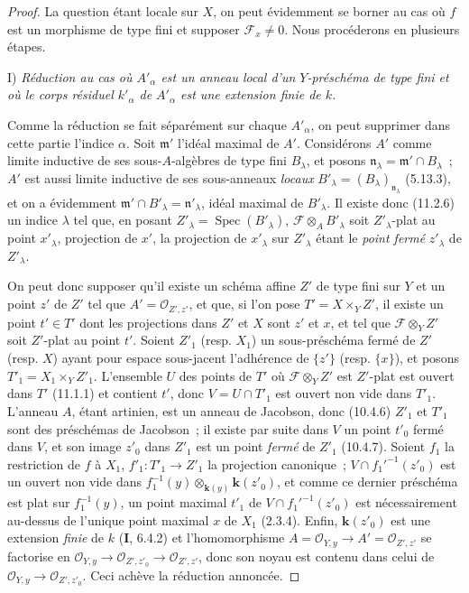 \begin{proof}
La question étant locale sur $X$, on peut évidemment se borner au cas où $f$
est un morphisme de type fini et supposer $\mathcal F_x\neq0$. Nous procéderons
en plusieurs étapes.

\medskip
\noindent I) \emph{Réduction au cas où $A'_\alpha$ est un anneau local
d'un $Y$-préschéma de type fini et où le corps résiduel $k'_\alpha$ de
$A'_\alpha$ est une extension finie de $k$.}

\medskip
Comme la réduction se fait séparément sur chaque $A'_\alpha$, on peut supprimer
dans cette partie l'indice $\alpha$. Soit $\mathfrak m'$ l'idéal maximal de
$A'$. Considérons $A'$ comme limite inductive de ses sous-$A$-algèbres de type
fini $B_\lambda$, et posons $\mathfrak n_\lambda=\mathfrak m'\cap B_\lambda$~;
$A'$ est aussi limite inductive de ses sous-anneaux \emph{locaux}
$B'_\lambda=(B_\lambda)_{\mathfrak n_\lambda}$ (5.13.3), et on a évidemment
$\mathfrak m'\cap B'_\lambda=\mathfrak n'_\lambda$, idéal maximal de
$B'_\lambda$. Il existe donc (11.2.6) un indice $\lambda$ tel que, en posant
$Z'_\lambda=\operatorname{Spec}(B'_\lambda)$,
$\mathcal F\otimes_A B'_\lambda$ soit $Z'_\lambda$-plat au point $x'_\lambda$,
projection de $x'$, la projection de $x'_\lambda$ sur $Z'_\lambda$ étant le
\emph{point fermé} $z'_\lambda$ de $Z'_\lambda$.

On peut donc supposer qu'il existe un schéma affine $Z'$ de type fini sur $Y$
et un point $z'$ de $Z'$ tel que $A'=\mathcal O_{Z',z'}$, et que, si l'on pose
$T'=X\times_Y Z'$, il existe un point $t'\in T'$ dont les projections dans
$Z'$ et $X$ sont $z'$ et $x$, et tel que $\mathcal F\otimes_Y Z'$ soit
$Z'$-plat au point $t'$. Soient $Z'_1$ (resp. $X_1$) un sous-préschéma fermé de
$Z'$ (resp. $X$) ayant pour espace sous-jacent l'adhérence de $\{z'\}$ (resp.
$\{x\}$), et posons $T'_1=X_1\times_Y Z'_1$. L'ensemble $U$ des points de
$T'$ où $\mathcal F\otimes_Y Z'$ est $Z'$-plat est ouvert dans $T'$ (11.1.1) et
contient $t'$, donc
$V=U\cap T'_1$ est ouvert non vide dans $T'_1$. L'anneau $A$, étant artinien,
est un anneau de Jacobson, donc (10.4.6) $Z'_1$ et $T'_1$ sont des préschémas de
Jacobson~; il existe par suite dans $V$ un point $t'_0$ fermé dans $V$, et son
image $z'_0$ dans $Z'_1$ est un point \emph{fermé} de $Z'_1$ (10.4.7). Soient $f_1$ la
restriction de $f$ à $X_1$, $f'_1:T'_1\to Z'_1$ la projection canonique~;
$V\cap f_1'^{-1}(z'_0)$ est un ouvert non vide dans
$f_1^{-1}(y)\otimes_{\mathbf{k}(y)}\boldsymbol{k}(z'_0)$, et comme ce dernier préschéma est plat sur
$f_1^{-1}(y)$, un point maximal $t'_1$ de $V\cap f_1'^{-1}(z'_0)$ est
nécessairement au-dessus de l'unique point maximal $x$ de $X_1$ (2.3.4).
Enfin, $\boldsymbol{k}(z'_0)$ est une extension \emph{finie} de $k$ (\textbf I, 6.4.2) et
l'homomorphisme $A=\mathcal O_{Y,y}\to A'=\mathcal O_{Z',z'}$ se factorise en
$\mathcal O_{Y,y}\to\mathcal O_{Z',z'_0}\to\mathcal O_{Z',z'}$, donc son noyau
est contenu dans celui de $\mathcal O_{Y,y}\to\mathcal O_{Z',z'_0}$. Ceci
achève la réduction annoncée.


\end{proof}
